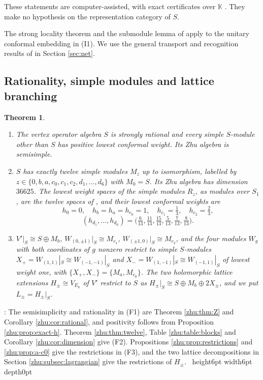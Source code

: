 \documentclass[leqno]{article}
\newcommand{\K}{\ensuremath{\mathbb{K}}}
\newcommand{\qed}{\hfill \vrule height6pt  width6pt depth0pt}
\newtheorem{thm}{Theorem}[section]
\newenvironment{proof}[1][]{\noindent {\it Proof #1} : }{\hbox{~}\qed
\smallskip
}
\numberwithin{equation}{section}
\begin{document}
These statements are computer-assisted, with exact certificates over $\K$ \cite[Appendix A]{Arh26}. They make no hypothesis on the representation category of $S$.

The strong locality theorem and the submodule lemma of \cite[Theorem 4.5 and Lemma 4.7]{ArhII} apply to the unitary conformal embedding in (I1). We use the general transport and recognition results of \cite[Proposition 5.2 and Theorem 6.1]{ArhII} in Section \ref{sec:net}.


\subsection{Rationality, simple modules and lattice branching}

\begin{thm}
\label{thm:zhu-inputs}
\begin{enumerate}
\item[\textup{(F1)}] The vertex operator algebra $S$ is strongly rational and every simple $S$-module other than $S$ has positive lowest conformal weight. Its Zhu algebra is semisimple.
\item[\textup{(F2)}] $S$ has exactly twelve simple modules $M_z$ up to isomorphism, labelled by $z \in \{0,b,a,c_0,c_1,c_2,\allowbreak d_1,\ldots,d_6\}$ with $M_0 = S$. Its Zhu algebra has dimension $36625$. The lowest weight spaces of the simple modules $R_z$, as modules over $S_1$, are the twelve spaces of \cite[Table 2]{Arh26}, and their lowest conformal weights are
\[
h_0 = 0,
\quad
h_b = h_a = h_{c_0} = 1,
\quad
h_{c_1} = \tfrac13,
\quad
h_{c_2} = \tfrac23,
\]
\[
(h_{d_1},\ldots,h_{d_6}) = \big(\tfrac{6}{13},\tfrac{11}{13},\tfrac{15}{13},\tfrac{5}{13},\tfrac{7}{13},\tfrac{8}{13}\big).
\]
\item[\textup{(F3)}] $V'|_S \cong S \oplus M_b$, $W_{(0,\pm1)}|_S \cong M_{c_1}$, $W_{(\pm1,0)}|_S \cong M_{c_2}$, and the four modules $W_g$ with both coordinates of $g$ nonzero restrict to simple $S$-modules $X_+ = W_{(1,1)}|_S \cong W_{(-1,-1)}|_S$ and $X_- = W_{(1,-1)}|_S \cong W_{(-1,1)}|_S$ of lowest weight one, with $\{X_+,X_-\} = \{M_a,M_{c_0}\}$. The two holomorphic lattice extensions $H_\pm \cong V_{E_8}$ of $V'$ restrict to $S$ as $H_\pm|_S \cong S \oplus M_b \oplus 2X_\pm$, and we put $L_\pm=H_\pm|_S$.
\end{enumerate}
\end{thm}

\begin{proof}
The semisimplicity and rationality in (F1) are Theorem \ref{zhu:thm:Z} and Corollary \ref{zhu:cor:rational}, and positivity follows from Proposition \ref{zhu:prop:exact-h}. Theorem \ref{zhu:thm:twelve}, Table \ref{zhu:table:blocks} and Corollary \ref{zhu:cor:dimension} give (F2). Propositions \ref{zhu:prop:restrictions} and \ref{zhu:prop:a-c0} give the restrictions in (F3), and the two lattice decompositions in Section \ref{zhu:subsec:lagrangian} give the restrictions of $H_\pm$.
\end{proof}
\end{document}

